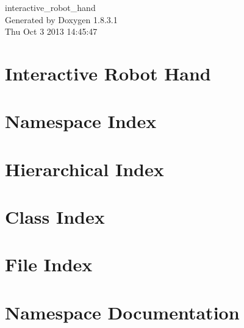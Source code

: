 \documentclass{book}
\begin{document}
\begin{titlepage}
\vspace*{7cm}
\begin{center}
{\Large interactive\-\_\-robot\-\_\-hand }\\
\vspace*{1cm}
{\large Generated by Doxygen 1.8.3.1}\\
\vspace*{0.5cm}
{\small Thu Oct 3 2013 14:45:47}\\
\end{center}
\end{titlepage}
\clearemptydoublepage
{}
\tableofcontents
\clearemptydoublepage
{}
\chapter{Interactive Robot Hand}
\label{index}
\chapter{Namespace Index}

\chapter{Hierarchical Index}

\chapter{Class Index}

\chapter{File Index}

\chapter{Namespace Documentation}











\end{document}
